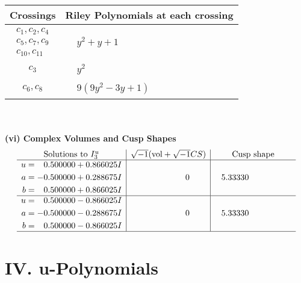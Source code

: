 \documentclass[1p]{elsarticle_modified}
\theoremstyle{definition}
\newcommand{\I}{\sqrt{-1}}
\begin{document}
\begin{tabular}{m{50pt}|m{274pt}}
Crossings & \hspace{64pt}Riley Polynomials at each crossing \\
\hline $$\begin{aligned}c_{1},c_{2},c_{4}\\c_{5},c_{7},c_{9}\\c_{10},c_{11}\end{aligned}$$&$\begin{aligned}
&y^2+y+1
\end{aligned}$\\
\hline $$\begin{aligned}c_{3}\end{aligned}$$&$\begin{aligned}
&y^2
\end{aligned}$\\
\hline $$\begin{aligned}c_{6},c_{8}\end{aligned}$$&$\begin{aligned}
&9(9 y^2-3 y+1)
\end{aligned}$\\
\hline
\end{tabular}\\~\\
\newpage\flushleft \textbf{(vi) Complex Volumes and Cusp Shapes}
$$\begin{array}{c|c|c}  
\text{Solutions to }I^u_{3}& \I (\text{vol} + \sqrt{-1}CS) & \text{Cusp shape}\\
 \hline 
\begin{aligned}
u &= \phantom{-}0.500000 + 0.866025 I \\
a &= -0.500000 + 0.288675 I \\
b &= \phantom{-}0.500000 + 0.866025 I\end{aligned}
 & \phantom{-0.000000 } 0 & \phantom{-}5.33330\phantom{ +0.000000I} \\ \hline\begin{aligned}
u &= \phantom{-}0.500000 - 0.866025 I \\
a &= -0.500000 - 0.288675 I \\
b &= \phantom{-}0.500000 - 0.866025 I\end{aligned}
 & \phantom{-0.000000 } 0 & \phantom{-}5.33330\phantom{ +0.000000I}\\
 \hline 
 \end{array}$$\newpage
\newpage\renewcommand{\arraystretch}{1}
\centering \section*{ IV. u-Polynomials}
\end{document}
